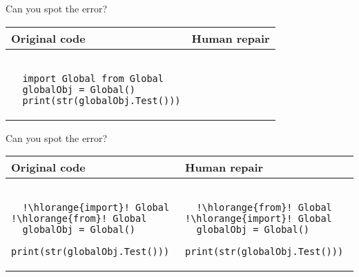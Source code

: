 \documentclass{beamer}
\begin{document}
\begin{frame}[fragile]{Can you spot the error?}
  \begin{center}
    \begin{tabular}{|m{5.5cm}|m{5.5cm}|}
      \hline \rule{0pt}{2.5ex}\textbf{Original code}\rule[-1ex]{0pt}{2ex} &  \rule{0pt}{2.5ex}\textbf{Human repair}\rule[-1ex]{0pt}{2ex} \\\hline
      \begin{lstlisting}[escapechar=!, basicstyle=\linespread{1.3}\ttfamily\footnotesize]

  import Global from Global
  globalObj = Global()
  print(str(globalObj.Test()))

      \end{lstlisting} & \begin{lstlisting}[escapechar=!, basicstyle=\linespread{1.3}\ttfamily\footnotesize]

      \end{lstlisting} \\\hline
    \end{tabular}
  \end{center}
\end{frame}

\begin{frame}[fragile]{Can you spot the error?}
  \begin{center}
    \begin{tabular}{|m{5.5cm}|m{5.5cm}|}
      \hline \rule{0pt}{2.5ex}\textbf{Original code}\rule[-1ex]{0pt}{2ex} &  \rule{0pt}{2.5ex}\textbf{Human repair}\rule[-1ex]{0pt}{2ex} \\\hline
      \begin{lstlisting}[escapechar=!, basicstyle=\linespread{1.3}\ttfamily\footnotesize]

  !\hlorange{import}! Global !\hlorange{from}! Global
  globalObj = Global()
  print(str(globalObj.Test()))

      \end{lstlisting} & \begin{lstlisting}[escapechar=!, basicstyle=\linespread{1.3}\ttfamily\footnotesize]

  !\hlorange{from}! Global !\hlorange{import}! Global
  globalObj = Global()
  print(str(globalObj.Test()))

      \end{lstlisting} \\\hline
    \end{tabular}
  \end{center}
\end{frame}
\end{document}
